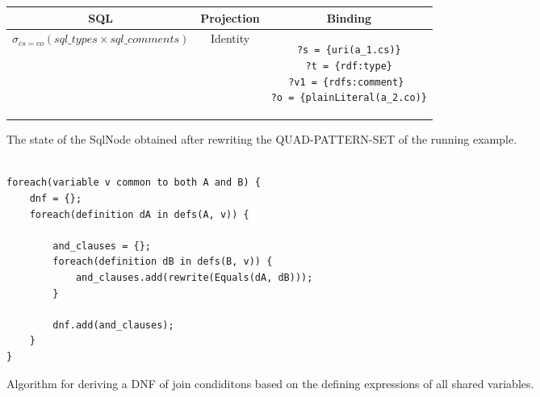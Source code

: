 \documentclass[a4paper,twoside,bibtotoc,abstracton,12pt,BCOR=15mm]{scrreprt}
\begin{document}
\begin{figure}[!h]
\begin{tabular}{ccc}
\toprule
SQL & Projection & Binding \\
\midrule

$\sigma_{cs = co} \left ( sql\_types \times sql\_comments \right )$

&

Identity

&

\begin{minipage}{5cm}
\begin{scriptsize}
\begin{verbatim}
?s = {uri(a_1.cs)}
?t = {rdf:type}
?v1 = {rdfs:comment} 
?o = {plainLiteral(a_2.co)}
\end{verbatim} 
\end{scriptsize}
\end{minipage}

\\
\bottomrule
\end{tabular}
\caption{The state of the SqlNode obtained after rewriting the QUAD-PATTERN-SET of the running example.}
\end{figure}

\begin{figure}
\begin{lstlisting} 

foreach(variable v common to both A and B) {
	dnf = {};
    foreach(definition dA in defs(A, v)) {
    
    	and_clauses = {};
    	foreach(definition dB in defs(B, v)) {
    		and_clauses.add(rewrite(Equals(dA, dB)));
    	}
    	
    	dnf.add(and_clauses);
    }
}
\end{lstlisting}
\caption{Algorithm for deriving a DNF of join condiditons based on the defining expressions of all shared variables.}
\label{alg:join}
\end{figure}
\end{document}
